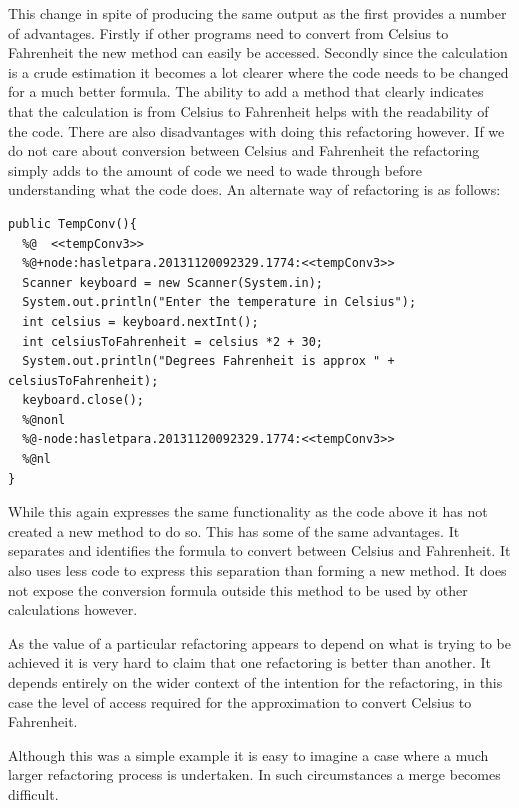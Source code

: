 \documentclass[12pt]{CRPITStyle}
\begin{document}
This change in spite of producing the same output as the first provides a number of advantages. Firstly if other programs need to convert from Celsius to Fahrenheit the new method can easily be accessed. Secondly since the calculation is a crude estimation it becomes a lot clearer where the code needs to be changed for a much better formula. The ability to add a method that clearly indicates that the calculation is from Celsius to Fahrenheit helps with the readability of the code. There are also disadvantages with doing this refactoring however. If we do not care about conversion between Celsius and Fahrenheit the refactoring simply adds to the amount of code we need to wade through before understanding what the code does. An alternate way of refactoring is as follows:

\begin{verbatim}
public TempConv(){
  %@  <<tempConv3>>
  %@+node:hasletpara.20131120092329.1774:<<tempConv3>>
  Scanner keyboard = new Scanner(System.in);
  System.out.println("Enter the temperature in Celsius");
  int celsius = keyboard.nextInt();
  int celsiusToFahrenheit = celsius *2 + 30;
  System.out.println("Degrees Fahrenheit is approx " + celsiusToFahrenheit);
  keyboard.close();
  %@nonl
  %@-node:hasletpara.20131120092329.1774:<<tempConv3>>
  %@nl
}
\end{verbatim}

While this again expresses the same functionality as the code above it has not created a new method to do so. This has some of the same advantages. It separates and identifies the formula to convert between Celsius and Fahrenheit. It also uses less code to express this separation than forming a new method. It does not expose the conversion formula outside this method to be used by other calculations however.

As the value of a particular refactoring appears to depend on what is trying to be achieved it is very hard to claim that one refactoring is better than another. It depends entirely on the wider context of the intention for the refactoring, in this case the level of access required for the approximation to convert Celsius to Fahrenheit.

Although this was a simple example it is easy to imagine a case where a much larger refactoring process is undertaken. In such circumstances a merge becomes difficult. 
\end{document}
